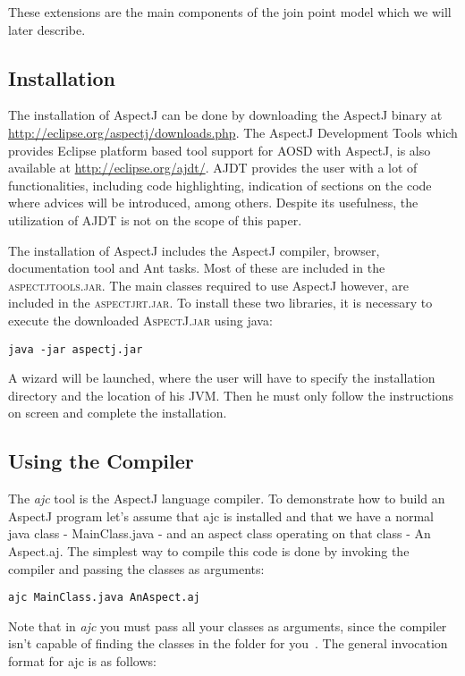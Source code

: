 \documentclass{template}
\begin{document}
These extensions are the main components of the join point model which we will later describe.

\subsection{Installation}

The installation of AspectJ can be done by downloading the AspectJ binary at \url{http://eclipse.org/aspectj/downloads.php}. 
The AspectJ Development Tools which provides Eclipse platform based tool support for AOSD with AspectJ, is also available at \url{http://eclipse.org/ajdt/}. AJDT provides the user with a lot of functionalities, including code highlighting, indication of sections on the code where advices will be introduced, among others. Despite its usefulness, the utilization of AJDT is not on the scope of this paper.

The installation of AspectJ includes the AspectJ compiler, browser, documentation tool and Ant tasks. Most of these are included in the \textsc{aspectjtools.jar}. The main classes required to use AspectJ however, are included in the \textsc{aspectjrt.jar}. To install these two libraries, it is necessary to execute the downloaded \textsc{AspectJ.jar} using java:

\verb!java -jar aspectj.jar!

A wizard will be launched, where the user will have to specify the installation directory and the location of his JVM. Then he must only follow the instructions on screen and complete the installation.

\subsection{Using the Compiler}

The \textit{ajc} tool is the AspectJ language compiler. To demonstrate how to build an AspectJ program let's assume that ajc is installed and that we have a normal java class - MainClass.java - and an aspect class operating on that class - An Aspect.aj. The simplest way to compile this code is done by invoking the compiler and passing the classes as arguments:

\verb!ajc MainClass.java AnAspect.aj!

Note that in \textit{ajc} you must pass all your classes as arguments, since the compiler isn't capable of finding the classes in the folder for you~\cite{ajcsite}. The general invocation format for ajc is as follows: 
\end{document}
